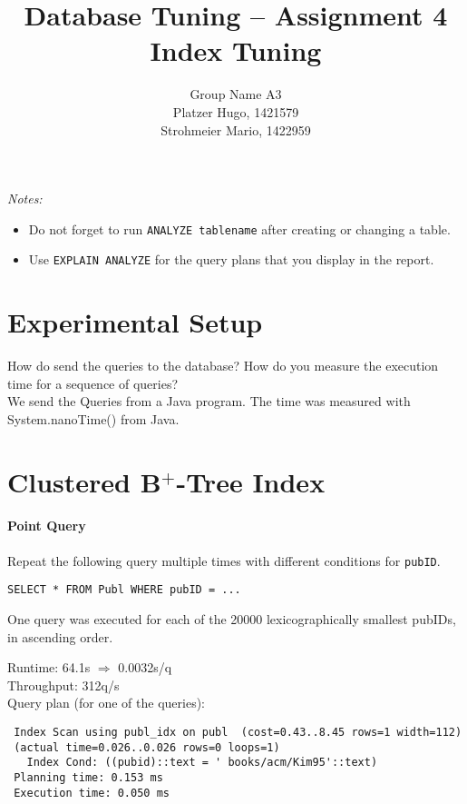 \documentclass[11pt]{scrartcl}
\title{
  \textbf{\large Database Tuning -- Assignment 4}\\
  Index Tuning
}
\author{
 Group Name A3\\
 \large Platzer Hugo, 1421579 \\
 \large Strohmeier Mario, 1422959 \\
}
\begin{document}
\maketitle

\noindent
{\it Notes:}
\begin{itemize}\itemsep=0pt
\item Do not forget to run {\tt ANALYZE tablename} after creating or
  changing a table.
\item Use {\tt EXPLAIN ANALYZE} for the query plans that you display in the report.
\end{itemize}


\section{Experimental Setup}

How do send the queries to the database? How do you measure the
execution time for a sequence of queries?\\
We send the Queries from a Java program. The time was measured with System.nanoTime() from Java.

\section{Clustered B$^+$-Tree Index}

\paragraph{Point Query}

Repeat the following query multiple times with different conditions for {\tt pubID}.

{\small
\begin{verbatim}
SELECT * FROM Publ WHERE pubID = ...
\end{verbatim}
}

\noindent
\newcommand{\condA}[1][20000]{
One query was executed for each of the #1 lexicographically smallest pubIDs,
in ascending order.
}
\condA

\smallskip\noindent
Runtime: 64.1s $\Rightarrow$ 0.0032s/q\\
Throughput: 312q/s\\

\smallskip\noindent
Query plan (for one of the queries):
{\small
\begin{verbatim}
 Index Scan using publ_idx on publ  (cost=0.43..8.45 rows=1 width=112)
 (actual time=0.026..0.026 rows=0 loops=1)
   Index Cond: ((pubid)::text = ' books/acm/Kim95'::text)
 Planning time: 0.153 ms
 Execution time: 0.050 ms
\end{verbatim}
}
\end{document}

